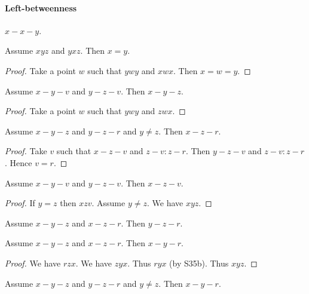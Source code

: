 \documentclass{article}
\newcommand{\Betw}[3]{#1 #2 #3}
\begin{document}
  \paragraph{Left-betweenness}

  \begin{forthel}
    \begin{lemma}[L3o3]
      $x-x-y$.
    \end{lemma}

    \begin{lemma} %
      Assume $\Betw{x}{y}{z}$ and $\Betw{y}{x}{z}$.
      Then $x = y$.
    \end{lemma}
    \begin{proof}
      Take a point $w$ such that
      $\Betw{y}{w}{y}$ and $\Betw{x}{w}{x}$.
      Then $x = w = y$.
    \end{proof}

    \begin{lemma} %
      Assume $x-y-v$ and $y-z-v$. Then $x-y-z$.
    \end{lemma}
    \begin{proof}
      Take a point $w$ such that
      $\Betw{y}{w}{y}$ and $\Betw{z}{w}{x}$.
    \end{proof}

    \begin{lemma}[L3o7a]
      Assume $x-y-z$ and $y-z-r$ and $y \neq z$. Then $x-z-r$.
    \end{lemma}
    \begin{proof}
    	Take $v$ such that $x-z-v$ and $z-v : z-r$.	Then $y-z-v$ and $z-v : z-r$. Hence $v = r$.
    \end{proof}

    \begin{lemma}[S35b] %
      Assume $x-y-v$ and $y-z-v$. Then $x-z-v$.
    \end{lemma}
    \begin{proof}
      If $y = z$ then $\Betw{x}{z}{v}$.
      Assume $y \neq z$.
      We have $\Betw{x}{y}{z}$.
    \end{proof}

    \begin{lemma}[L3o6a]
      Assume $x-y-z$ and $x-z-r$. Then $y-z-r$.
    \end{lemma}

    \begin{lemma} %
      Assume $x-y-z$ and $x-z-r$. Then $x-y-r$.
    \end{lemma}
    \begin{proof}
      We have $\Betw{r}{z}{x}$.
      We have $\Betw{z}{y}{x}$.
      Thus $\Betw{r}{y}{x}$ (by S35b).
      Thus $\Betw{x}{y}{z}$.
    \end{proof}



    \begin{lemma}[L3o7b]
      Assume $x-y-z$ and $y-z-r$ and $y \neq z$. Then $x-y-r$.
    \end{lemma}
  \end{forthel}
\end{document}
